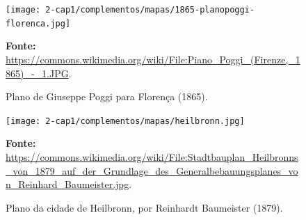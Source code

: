 \begin{a3paisagem}
\begin{figure}[!htp]
\caption{Plano de Giuseppe Poggi para Florença (1865).}
\centering
\texttt{[image: 2-cap1/complementos/mapas/1865-planopoggi-florenca.jpg]}{\par \footnotesize \textbf{Fonte:} \url{https://commons.wikimedia.org/wiki/File:Piano_Poggi_(Firenze,_1865)_-_1.JPG}.}
\label{fig:florenca1865} 
\end{figure}
\end{a3paisagem}

\begin{a3paisagem}
\begin{figure}[!htp]
\caption{Plano da cidade de Heilbronn, por Reinhardt Baumeister (1879).}
\centering
\texttt{[image: 2-cap1/complementos/mapas/heilbronn.jpg]}{\par \footnotesize \textbf{Fonte:} \url{https://commons.wikimedia.org/wiki/File:Stadtbauplan_Heilbronns_von_1879_auf_der_Grundlage_des_Generalbebauungsplanes_von_Reinhard_Baumeister.jpg}. }
\label{fig:heilbronn1879} 
\end{figure}
\end{a3paisagem}

